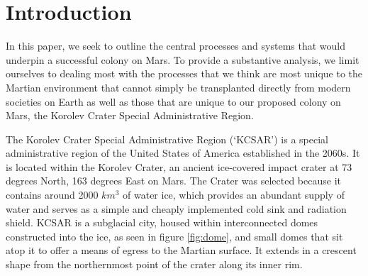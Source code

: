 \documentclass[fleqn,10pt]{Stylesheet} %
\affiliation{\textsuperscript{1}\textit{OrionVM, University of Sydney Alumni}} %
\affiliation{\textsuperscript{2}\textit{??}} %
\affiliation{\textsuperscript{3}\textit{??}} %
\affiliation{\textsuperscript{4}\textit{Artist @id\textunderscore epifanio}} %
\affiliation{*\textbf{Corresponding author}: alex@asharp.id.au} %
\begin{document}
\flushbottom %
\maketitle %
\thispagestyle{empty} %


\section*{Introduction}
In this paper, we seek to outline the central processes and systems that would underpin a successful colony on Mars. To provide a substantive analysis, we limit ourselves to dealing most with the processes that we think are most unique to the Martian environment that cannot simply be transplanted directly from modern societies on Earth as well as those that are unique to our proposed colony on Mars, the Korolev Crater Special Administrative Region. 

The Korolev Crater Special Administrative Region (‘KCSAR’) is a special administrative region of the United States of America established in the 2060s. It is located within the Korolev Crater, an ancient ice-covered impact crater at 73 degrees North, 163 degrees East on Mars. The Crater was selected because it contains around 2000 $km^{3}$ of water ice, which provides an abundant supply of water and serves as a simple and cheaply implemented cold sink and radiation shield. KCSAR is a subglacial city, housed within interconnected domes constructed into the ice, as seen in figure \ref{fig:dome}, and small domes that sit atop it to offer a means of egress to the Martian surface. It extends in a crescent shape from the northernmost point of the crater along its inner rim.


\end{document}
